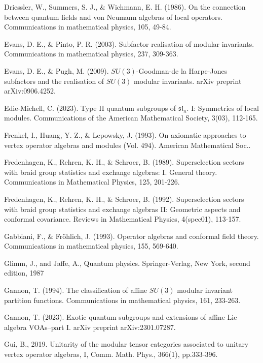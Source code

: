 \documentclass[11pt,b5paper,notitlepage]{article}
\theoremstyle{definition}
\theoremstyle{plain}
\newcommand{\fk}{\mathfrak}
\numberwithin{equation}{section}
\begin{document}
\begin{thebibliography}{999999}
Driessler, W., Summers, S. J., \& Wichmann, E. H. (1986). On the connection between quantum fields and von Neumann algebras of local operators. Communications in mathematical physics, 105, 49-84.

Evans, D. E., \& Pinto, P. R. (2003). Subfactor realisation of modular invariants. Communications in mathematical physics, 237, 309-363.

Evans, D. E., \& Pugh, M. (2009). $SU(3)$-Goodman-de la Harpe-Jones subfactors and the realisation of $SU(3)$ modular invariants. arXiv preprint arXiv:0906.4252.

Edie-Michell, C. (2023). Type II quantum subgroups of $\fk{sl}_n$. I: Symmetries of local modules. Communications of the American Mathematical Society, 3(03), 112-165.

Frenkel, I., Huang, Y. Z., \& Lepowsky, J. (1993). On axiomatic approaches to vertex operator algebras and modules (Vol. 494). American Mathematical Soc..

Fredenhagen, K., Rehren, K. H., \& Schroer, B. (1989). Superselection sectors with braid group statistics and exchange algebras: I. General theory. Communications in Mathematical Physics, 125, 201-226.

Fredenhagen, K., Rehren, K. H., \& Schroer, B. (1992). Superselection sectors with braid group statistics and exchange algebras II: Geometric aspects and conformal covariance. Reviews in Mathematical Physics, 4(spec01), 113-157.

Gabbiani, F., \& Fröhlich, J. (1993). Operator algebras and conformal field theory. Communications in mathematical physics, 155, 569-640.

Glimm, J., and Jaffe, A., Quantum physics. Springer-Verlag, New York, second edition, 1987

Gannon, T. (1994). The classification of affine $SU(3)$ modular invariant partition functions. Communications in mathematical physics, 161, 233-263.

Gannon, T. (2023). Exotic quantum subgroups and extensions of affine Lie algebra VOAs--part I. arXiv preprint arXiv:2301.07287.

Gui, B., 2019. Unitarity of the modular tensor categories associated to unitary vertex operator algebras, I, Comm. Math. Phys., 366(1), pp.333-396.


\end{thebibliography}
\end{document}
